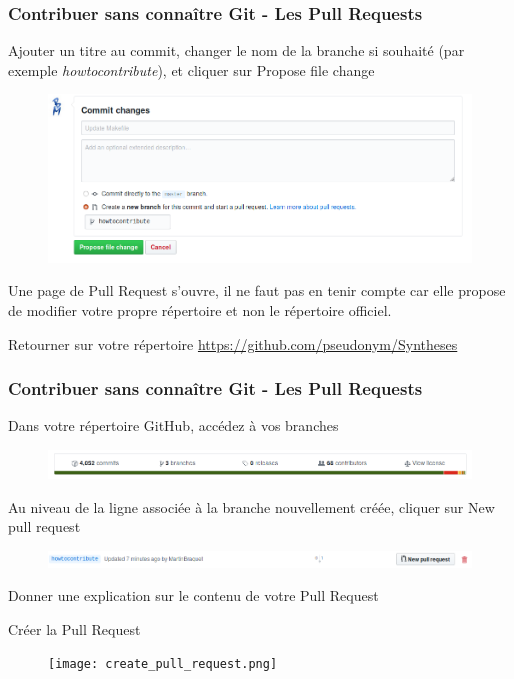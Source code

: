 \documentclass{beamer}
\newenvironment{wideitemize}{\itemize\addtolength{\itemsep}{10pt}}{\enditemize}
\begin{document}
\begin{frame}
    \frametitle{Contribuer sans connaître Git - Les Pull Requests}
    \begin{wideitemize}
        \item Ajouter un titre au commit, changer le nom de la branche si souhaité (par exemple \textit{howtocontribute}), et cliquer sur Propose file change
        \begin{figure}[H]
            \centering
            \includegraphics[width=0.8\linewidth]{modif_online_commit.png}
        \end{figure}
        \item Une page de Pull Request s'ouvre, il ne faut pas en tenir compte car elle propose de modifier votre propre répertoire et non le répertoire officiel.
        \item Retourner sur votre répertoire \url{https://github.com/pseudonym/Syntheses}
     \end{wideitemize}
\end{frame}

\begin{frame}
\label{PR}
    \frametitle{Contribuer sans connaître Git - Les Pull Requests}
    \begin{wideitemize}
        \item Dans votre répertoire GitHub, accédez à vos branches
            \begin{figure}[H]
                \centering
                \includegraphics[width=\linewidth]{modif_online_branches.png}
            \end{figure}
        \item Au niveau de la ligne associée à la branche nouvellement créée, cliquer sur New pull request
            \begin{figure}[H]
                \centering
                \includegraphics[width=\linewidth]{modif_online_PR.png}
            \end{figure}
         \item Donner une explication sur le contenu de votre Pull Request
         \item Créer la Pull Request
            \begin{figure}[H]
                \centering
                \texttt{[image: create\_pull\_request.png]}
            \end{figure}
     \end{wideitemize}
\end{frame}
\end{document}
